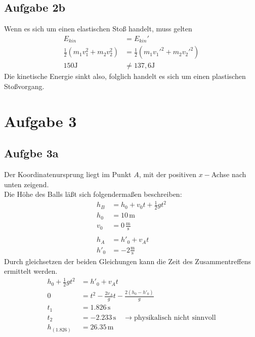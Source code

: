 \documentclass[a4paper,10pt]{extarticle}
\begin{document}
\subsection*{Aufgabe 2b}
Wenn es sich um einen elastischen Stoß handelt, muss gelten
\begin{align*}
  E_{kin} &= E_{kin}'\\
  \frac{1}{2}(m_1v_1^2+m_2v_2^2) &= \frac{1}{2}(m_1v_1'^2+m_2v_2'^2)\\
  150 \mbox{J} &\neq 137,6 \mbox{J}
\end{align*}
Die kinetische Energie sinkt also, folglich handelt es sich um einen plastischen Stoßvorgang.

\section*{Aufgabe 3}
  \subsection*{Aufgbe 3a}
  Der Koordinatenursprung liegt im Punkt $A$, mit der positiven $x-$Achse nach unten zeigend. \\ 
  Die Höhe des Balls läßt sich folgendermaßen beschreiben:
  \begin{align*}
  h_B &= h_0 + v_0 t + \frac{1}{2}gt^2 \\
  h_0 &= 10 \, \mbox{m} \\ 
  v_0 &= 0 \, \frac{\mbox{m}}{\mbox{s}} \\ \\
  h_A &= h'_0 + v_A t \\
  h'_0 &= -2 \frac{\mbox{m}}{\mbox{s}}
  \end{align*}
  Durch gleichsetzen der beiden Gleichungen kann die Zeit des Zusammentreffens ermittelt werden.
  \begin{align*}
  h_0 + \frac{1}{2}gt^2 &= h'_0 + v_A t \\
  0 &= t^2 - \frac{2 v_A}{g} t - \frac{2(h_0 - h'_0)}{g} \\
  t_1 &= 1.826 \, \mbox{s} \\
  t_2 &= -2.233 \, \mbox{s} \quad \rightarrow \mbox{physikalisch nicht sinnvoll}\\
  h_{(1.826)} &= 26.35\, \mbox{m}
  \end{align*}
\end{document}
